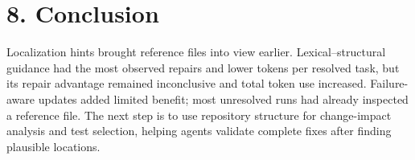 \section*{8. Conclusion}

Localization hints brought reference files into view earlier. Lexical--structural guidance had
the most observed repairs and lower tokens per resolved task, but its repair advantage remained
inconclusive and total token use increased. Failure-aware updates added limited benefit;
most unresolved runs had already inspected a reference file. The next step is to use repository
structure for change-impact analysis and test selection, helping agents validate complete fixes
after finding plausible locations.
